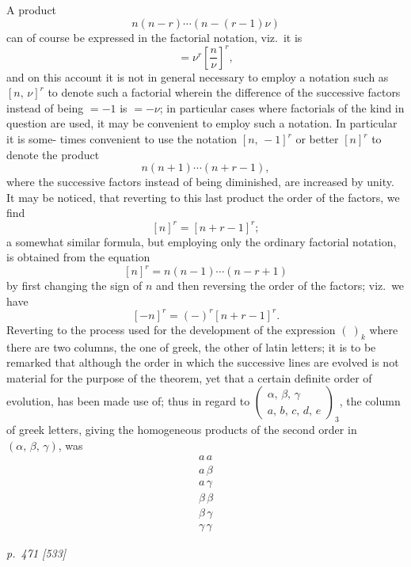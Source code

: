 \documentclass[11pt,a4paper]{book}
\begin{document}
A product
\[
n(n-r)\cdots(n-(r-1)\nu)
\]
can of course be expressed in the factorial notation, viz.\ it is
\[
=\nu^r\left[\frac{n}{\nu}\right]^r,
\]
and on this account it is not in general necessary to employ a notation such as
$[n,\,\nu]^r$ to denote such a factorial wherein the difference of the successive factors instead
of being $= -1$ is $= -\nu$; in particular cases where factorials of the kind in question
are used, it may be convenient to employ such a notation. In particular it is some-
times convenient to use the notation $[n,\,-1]^r$ or better $[n]^r$ to denote the product
\[
n(n+1)\cdots(n+r-1),
\]
where the successive factors instead of being diminished, are increased by unity. It
may be noticed, that reverting to this last product the order of the factors, we find
\[
[n]^r = [n+r-1]^r;
\]
a somewhat similar formula, but employing only the ordinary factorial notation, is
obtained from the equation
\[
[n]^r = n(n-1)\cdots(n-r+1)
\]
by first changing the sign of $n$ and then reversing the order of the factors; viz.\ we have
\[
[-n]^r = (-)^r[n+r-1]^r.
\]
Reverting to the process used for the development of the expression $(\ )_k$ where there
are two columns, the one of greek, the other of latin letters; it is to be remarked
that although the order in which the successive lines are evolved is not material for
the purpose of the theorem, yet that a certain definite order of evolution, has been
made use of; thus in regard to $\begin{pmatrix} \alpha,\,\beta,\,\gamma \\ a,\,b,\,c,\,d,\,e \end{pmatrix}_3$, the column of greek letters, giving
the homogeneous products of the second order in $(\alpha,\,\beta,\,\gamma)$, was
\[
\begin{array}{l}
a\,a \\
a\,\beta \\
a\,\gamma \\
\beta\,\beta \\
\beta\,\gamma \\
\gamma\,\gamma
\end{array}
\]

\clearpage

\bigskip
\textit{p.~471 [533]}
\smallskip
\end{document}
